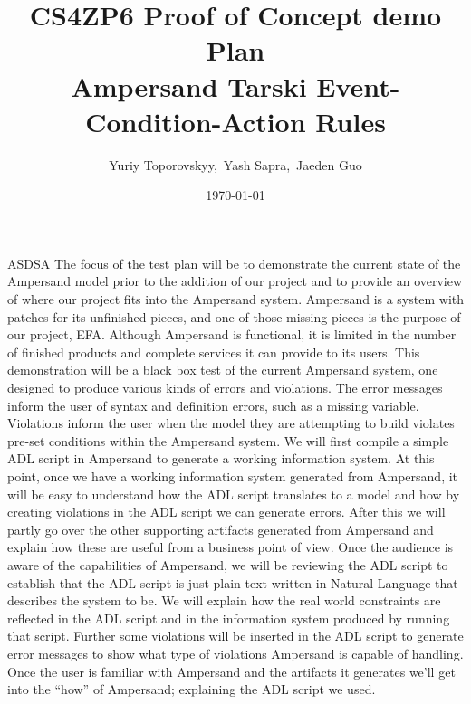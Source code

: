 \documentclass[12pt]{article}
\begin{document}
\title{CS4ZP6 Proof of Concept demo Plan \\ Ampersand Tarski Event-Condition-Action 
Rules \\ \vspace{2ex}} 
\author{\normalsize{Yuriy Toporovskyy,\ Yash Sapra,\ Jaeden Guo}}
\date{\normalsize\today \vspace{1ex}}
\thispagestyle{empty}
\maketitle
\paragraph{}
ASDSA
The focus of the test plan will be to demonstrate the current state of the 
Ampersand model prior to the addition of our project and to provide an overview 
of where our project fits into the Ampersand system. Ampersand is a system with 
patches for its unfinished pieces, and one of those missing pieces is the 
purpose of our project, EFA. Although Ampersand is functional, it is limited in 
the number of finished products and complete services it can provide to its 
users. This demonstration will be a black box test of the current Ampersand 
system, one designed to produce various kinds of errors and violations. The 
error messages inform the user of syntax and definition errors, such as a 
missing variable. Violations inform the user when the model they are attempting 
to build violates pre-set conditions within the Ampersand system. 
\newline\newline
\indent We will first compile a simple ADL script in Ampersand to generate a working
information system. At this point, once we have a working information system generated from Ampersand,
it will be easy to understand how the ADL script translates to a model and how by creating violations in the ADL script we can generate errors. After this we will partly go over the other supporting artifacts generated from Ampersand and explain how these are useful from a business point of view. 
Once the audience is aware of the capabilities of Ampersand, we will be reviewing 
the ADL script to establish that the ADL script is just plain text written in Natural Language that
 describes the system to be.
We will explain how the real world constraints are reflected in the ADL script and in the information system produced by running that script. Further some violations will be inserted in the ADL script to generate error messages to show what type of violations Ampersand is capable of handling. Once the user is familiar with Ampersand and the artifacts it generates we'll get into the ``how'' of  Ampersand; explaining the ADL script we used. 
 
\end{document}
